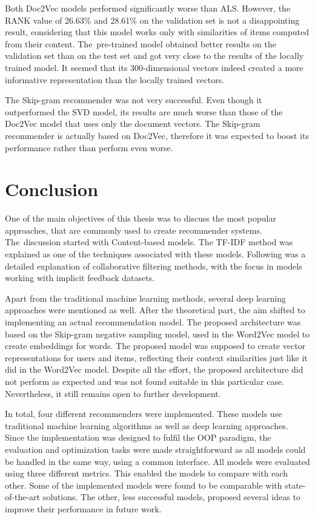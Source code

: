 Both Doc2Vec models performed significantly worse than ALS. However, the RANK value of 26.63\% and 28.61\% on the validation set is not a disappointing result, considering that this model works only with similarities of items computed from their content. The~pre-trained model obtained better results on the validation set than on the test set and got very close to the results of the locally trained model. It seemed that its 300-dimensional vectors indeed created a more informative representation than the locally trained vectors.

The Skip-gram recommender was not very successful. Even though it outperformed the SVD model, its results are much worse than those of the Doc2Vec model that uses only the document vectors. The Skip-gram recommender is actually based on Doc2Vec, therefore it was expected to boost its performance rather than perform even worse.


\chapter*{Conclusion} \label{zaver}
One of the main objectives of this thesis was to discuss the most popular approaches, that are commonly used to create recommender systems. The~discussion started with Content-based models. The TF-IDF method was explained as one of the techniques associated with these models. Following was a detailed explanation of collaborative filtering methods, with the focus in models working with implicit feedback datasets. 

Apart from the traditional machine learning methods, several deep learning approaches were mentioned as well. After the theoretical part, the aim shifted to implementing an actual recommendation model. The proposed architecture was based on the Skip-gram negative sampling model, used in the Word2Vec model to create embeddings for words. The proposed model was supposed to create vector representations for users and items, reflecting their context similarities just like it did in the Word2Vec model. Despite all the effort, the proposed architecture did not perform as expected and was not found suitable in this particular case. Nevertheless, it still remains open to further development. 

In total, four different recommenders were implemented. These models use traditional machine learning algorithms as well as deep learning approaches. Since the implementation was designed to fulfil the OOP paradigm, the evaluation and optimization tasks were made straightforward as all models could be handled in the same way, using a common interface. All models were evaluated using three different metrics. This enabled the models to compare with each other. Some of the implemented models were found to be comparable with state-of-the-art solutions. The other, less successful models, proposed several ideas to improve their performance in future work. 


